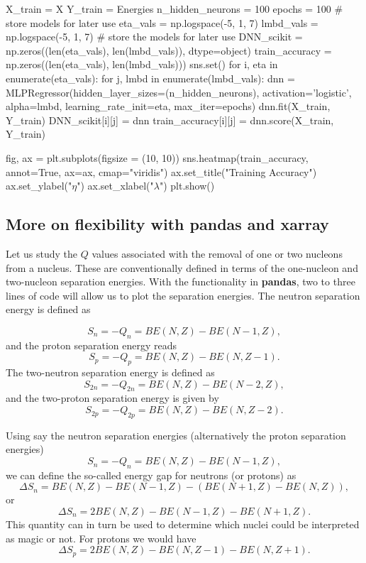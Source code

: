 \documentclass[%
oneside,                 %
final,                   %
10pt]{article}
\begin{document}
X_train = X
Y_train = Energies
n_hidden_neurons = 100
epochs = 100
# store models for later use
eta_vals = np.logspace(-5, 1, 7)
lmbd_vals = np.logspace(-5, 1, 7)
# store the models for later use
DNN_scikit = np.zeros((len(eta_vals), len(lmbd_vals)), dtype=object)
train_accuracy = np.zeros((len(eta_vals), len(lmbd_vals)))
sns.set()
for i, eta in enumerate(eta_vals):
    for j, lmbd in enumerate(lmbd_vals):
        dnn = MLPRegressor(hidden_layer_sizes=(n_hidden_neurons), activation='logistic',
                            alpha=lmbd, learning_rate_init=eta, max_iter=epochs)
        dnn.fit(X_train, Y_train)
        DNN_scikit[i][j] = dnn
        train_accuracy[i][j] = dnn.score(X_train, Y_train)

fig, ax = plt.subplots(figsize = (10, 10))
sns.heatmap(train_accuracy, annot=True, ax=ax, cmap="viridis")
ax.set_title("Training Accuracy")
ax.set_ylabel("$\eta$")
ax.set_xlabel("$\lambda$")
plt.show()



\epycod

\subsection{More on flexibility with pandas and xarray}

Let us study the $Q$ values associated with the removal of one or two nucleons from
a nucleus. These are conventionally defined in terms of the one-nucleon and two-nucleon
separation energies. With the functionality in \textbf{pandas}, two to three lines of code will allow us to plot the separation energies.
The neutron separation energy is defined as 

\[
S_n= -Q_n= BE(N,Z)-BE(N-1,Z),
\]
and the proton separation energy reads
\[
S_p= -Q_p= BE(N,Z)-BE(N,Z-1).
\]
The two-neutron separation energy is defined as
\[
S_{2n}= -Q_{2n}= BE(N,Z)-BE(N-2,Z),
\]
and  the two-proton separation energy is given by
\[
S_{2p}= -Q_{2p}= BE(N,Z)-BE(N,Z-2).
\]

Using say the neutron separation energies (alternatively the proton separation energies)
\[
S_n= -Q_n= BE(N,Z)-BE(N-1,Z),
\]
we can define the so-called energy gap for neutrons (or protons) as 
\[
\Delta S_n= BE(N,Z)-BE(N-1,Z)-\left(BE(N+1,Z)-BE(N,Z)\right),
\]
or 
\[
\Delta S_n= 2BE(N,Z)-BE(N-1,Z)-BE(N+1,Z).
\]
This quantity can in turn be used to determine which nuclei could be interpreted as  magic or not. 
For protons we would have 
\[
\Delta S_p= 2BE(N,Z)-BE(N,Z-1)-BE(N,Z+1).
\]
\end{document}
